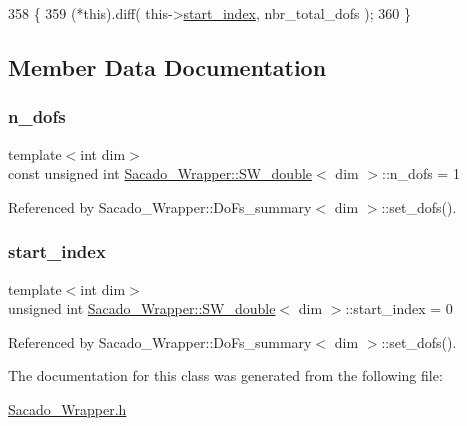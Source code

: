 \begin{DoxyCode}
358     \{
359         (*this).diff( this->\hyperlink{classSacado__Wrapper_1_1SW__double_aa0927ce06528899dd44afe5d770840c1}{start\_index}, nbr\_total\_dofs );
360     \}
\end{DoxyCode}


\subsection{Member Data Documentation}
\mbox{\label{classSacado__Wrapper_1_1SW__double_a45e46904e5fd5be42bb4c9bb7454ffc5}} 
\subsubsection{\texorpdfstring{n\+\_\+dofs}{n\_dofs}}
{\footnotesize\ttfamily template$<$int dim$>$ \\
const unsigned int \hyperlink{classSacado__Wrapper_1_1SW__double}{Sacado\+\_\+\+Wrapper\+::\+S\+W\+\_\+double}$<$ dim $>$\+::n\+\_\+dofs = 1\hspace{0.3cm}{\ttfamily [static]}}



Referenced by Sacado\+\_\+\+Wrapper\+::\+Do\+Fs\+\_\+summary$<$ dim $>$\+::set\+\_\+dofs().

\mbox{\label{classSacado__Wrapper_1_1SW__double_aa0927ce06528899dd44afe5d770840c1}} 
\subsubsection{\texorpdfstring{start\+\_\+index}{start\_index}}
{\footnotesize\ttfamily template$<$int dim$>$ \\
unsigned int \hyperlink{classSacado__Wrapper_1_1SW__double}{Sacado\+\_\+\+Wrapper\+::\+S\+W\+\_\+double}$<$ dim $>$\+::start\+\_\+index = 0}



Referenced by Sacado\+\_\+\+Wrapper\+::\+Do\+Fs\+\_\+summary$<$ dim $>$\+::set\+\_\+dofs().



The documentation for this class was generated from the following file\+:\begin{DoxyCompactItemize}
\item 
\hyperlink{Sacado__Wrapper_8h}{Sacado\+\_\+\+Wrapper.\+h}\end{DoxyCompactItemize}
